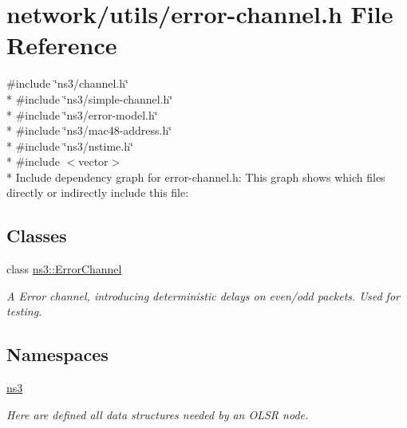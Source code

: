 \hypertarget{error-channel_8h}{}\section{network/utils/error-\/channel.h File Reference}
\label{error-channel_8h}
{\ttfamily \#include \char`\"{}ns3/channel.\+h\char`\"{}}\\*
{\ttfamily \#include \char`\"{}ns3/simple-\/channel.\+h\char`\"{}}\\*
{\ttfamily \#include \char`\"{}ns3/error-\/model.\+h\char`\"{}}\\*
{\ttfamily \#include \char`\"{}ns3/mac48-\/address.\+h\char`\"{}}\\*
{\ttfamily \#include \char`\"{}ns3/nstime.\+h\char`\"{}}\\*
{\ttfamily \#include $<$vector$>$}\\*
Include dependency graph for error-\/channel.h\+:
This graph shows which files directly or indirectly include this file\+:
\subsection*{Classes}
\begin{DoxyCompactItemize}
\item 
class \hyperlink{classns3_1_1ErrorChannel}{ns3\+::\+Error\+Channel}
\begin{DoxyCompactList}\small\item\em A Error channel, introducing deterministic delays on even/odd packets. Used for testing. \end{DoxyCompactList}\end{DoxyCompactItemize}
\subsection*{Namespaces}
\begin{DoxyCompactItemize}
\item 
 \hyperlink{namespacens3}{ns3}
\begin{DoxyCompactList}\small\item\em Here are defined all data structures needed by an O\+L\+SR node. \end{DoxyCompactList}\end{DoxyCompactItemize}
